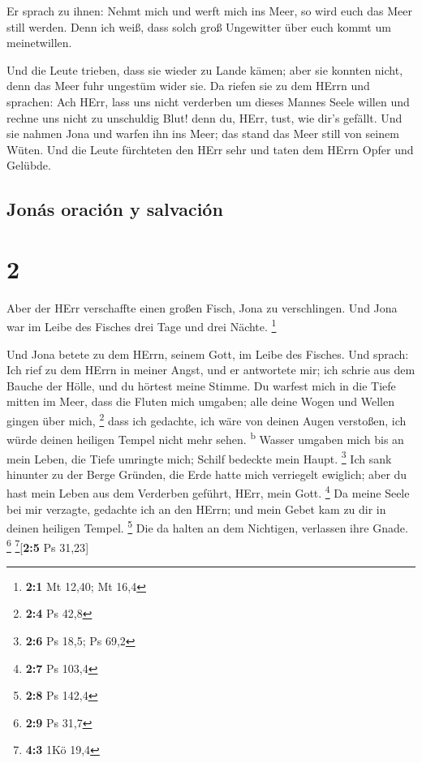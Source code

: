  Er sprach zu ihnen: Nehmt mich und werft mich ins Meer,
so wird euch das Meer still werden. Denn ich weiß, dass solch groß
Ungewitter über euch kommt um meinetwillen.

 Und die Leute trieben, dass sie wieder zu Lande kämen;
aber sie konnten nicht, denn das Meer fuhr ungestüm wider sie.
 Da riefen sie zu dem HErrn und sprachen: Ach HErr, lass
uns nicht verderben um dieses Mannes Seele willen und rechne uns nicht
zu unschuldig Blut! denn du, HErr, tust, wie dir's gefällt.
 Und sie nahmen Jona und warfen ihn ins Meer; das stand
das Meer still von seinem Wüten.  Und die Leute
fürchteten den HErr sehr und taten dem HErrn Opfer und Gelübde.

\hypertarget{jonuxe1s-oraciuxf3n-y-salvaciuxf3n}{%
\subsection{Jonás oración y
salvación}\label{jonuxe1s-oraciuxf3n-y-salvaciuxf3n}}

\hypertarget{section-1}{%
\section{2}\label{section-1}}

 Aber der HErr verschaffte einen großen Fisch, Jona zu
verschlingen. Und Jona war im Leibe des Fisches drei Tage und drei
Nächte. \footnote{\textbf{2:1} Mt 12,40; Mt 16,4}

 Und Jona betete zu dem HErrn, seinem Gott, im Leibe des
Fisches.  Und sprach: Ich rief zu dem HErrn in meiner
Angst, und er antwortete mir; ich schrie aus dem Bauche der Hölle, und
du hörtest meine Stimme.  Du warfest mich in die Tiefe
mitten im Meer, dass die Fluten mich umgaben; alle deine Wogen und
Wellen gingen über mich, \footnote{\textbf{2:4} Ps 42,8} 
dass ich gedachte, ich wäre von deinen Augen verstoßen, ich würde deinen
heiligen Tempel nicht mehr sehen. \textsuperscript{b} 
Wasser umgaben mich bis an mein Leben, die Tiefe umringte mich; Schilf
bedeckte mein Haupt. \footnote{\textbf{2:6} Ps 18,5; Ps 69,2}
 Ich sank hinunter zu der Berge Gründen, die Erde hatte
mich verriegelt ewiglich; aber du hast mein Leben aus dem Verderben
geführt, HErr, mein Gott. \footnote{\textbf{2:7} Ps 103,4}
 Da meine Seele bei mir verzagte, gedachte ich an den
HErrn; und mein Gebet kam zu dir in deinen heiligen Tempel. \footnote{\textbf{2:8}
  Ps 142,4}  Die da halten an dem Nichtigen, verlassen
ihre Gnade. \footnote{\textbf{2:9} Ps 31,7} \footnote{\textbf{4:3} 1Kö
  19,4}{[}\textbf{2:5} Ps 31,23{]}

